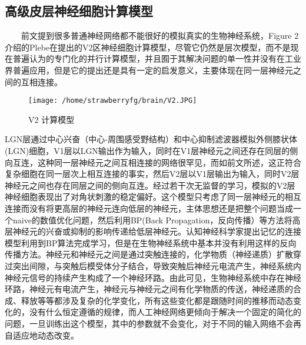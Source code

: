 \documentclass{article}
\begin{document}
\begin{spacing}{1.0}
\subsection{高级皮层神经细胞计算模型}
\ \ \ \ 前文提到很多普通神经网络都不能很好的模拟真实的生物神经系统，Figure 2介绍的Plebe在\cite{attention}提出的V2区神经细胞计算模型，尽管它仍然是层次模型，而不是现在普遍认为的专门化的并行计算模型，并且囿于其解决问题的单一性并没有在工业界普遍应用，但是它的提出还是具有一定的启发意义，主要体现在同一层神经元之间的互相连接。\par 
\begin{figure}[htbp]
\centering
\texttt{[image: /home/strawberryfg/brain/V2.JPG]}
\caption{V2 计算模型\cite{jsll}}
\end{figure}\par 
LGN层通过中心兴奋（中心-周围感受野结构）和中心抑制滤波器模拟外侧膝状体(LGN)细胞，V1层以LGN输出作为输入，同时在V1层神经元之间还存在同层的侧向互连，这种同一层神经元之间互相连接的网络很罕见，而如前文所述，这正符合复杂细胞在同一层次上相互连接的事实，然后V2层以V1层输出为输入，同时V2层神经元之间也存在同层之间的侧向互连。经过若干次无监督的学习，模拟的V2层神经细胞表现出了对角状刺激的稳定偏好。这个模型只考虑了同一层神经元的相互连接而没有将更高层的神经元连向低层的神经元，主体思想还是把整个问题当成一个naive的数值优化问题，然后利用BP(Back Propagation，反向传播）等方法将高层神经元的兴奋或抑制的影响传递给低层神经元。认知神经科学家提出记忆的连接模型利用到BP算法完成学习，但是在生物神经系统中基本并没有利用这样的反向传播方法。神经元和神经元之间是通过突触连接的，化学物质（神经递质）扩散穿过突出间隙，与突触后模受体分子结合，导致突触后神经元电流产生，神经系统内神经元信号的持续产生构成了一个神经环路\cite{main}。由此可见，生物神经系统中存在神经环路，神经元有电流产生，神经元与神经元之间有化学物质的传送，神经递质的合成、释放等等都涉及复杂的化学变化，所有这些变化都是跟随时间的推移而动态变化的，没有什么恒定遵循的规律，而人工神经网络更倾向于解决一个固定的简化的问题，一旦训练出这个模型，其中的参数就不会变化，对于不同的输入网络不会再自适应地动态改变。

\end{spacing}
\end{document}
